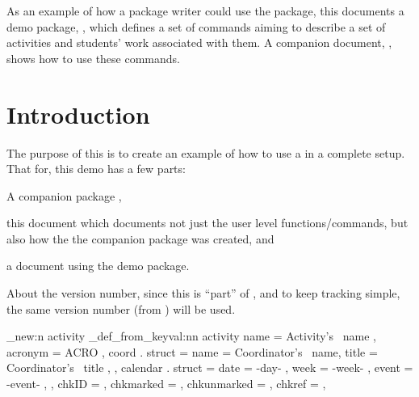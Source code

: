 \documentclass[10pt]{article}
\begin{document}
 
 
\begin{tsabstract}
  As an example of how a package writer could use the  package, this documents a demo package, , which defines a set of commands aiming to describe a set of activities and students' work associated with them. A companion document, , shows how to use these commands.
\end{tsabstract}

\tableofcontents

\section{Introduction}
The purpose of this is to create an example of how to use a  in a complete setup. That for, this demo has a few parts:
\begin{enumerate*}
  \item A companion package ,
  \item this document which documents not just the user level functions/commands, but also how the the companion package was created, and
  \item a document using the demo package.
\end{enumerate*}
\begin{tsremark}
  About the version number, since this is ``part'' of , and to keep tracking simple, the same version number (from ) will be used.
\end{tsremark}


\begin{codestore}
\starray_new:n {activity}
\starray_def_from_keyval:nn {activity} {
    name = Activity's~ name ,
    acronym = ACRO ,
    coord . struct =  {
        name = Coordinator's~ name,
        title = Coordinator's~ title ,
      } ,
    calendar . struct = {
        date = {-day-} ,
        week = {-week-} ,
        event = {-event-} ,
      } ,
    chkID = ,        %
    chkmarked = ,    %
    chkunmarked = ,  %
    chkref = ,       %
  }
\end{codestore}
\end{document}
